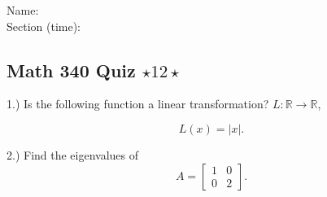 \documentclass{article}
\begin{document}
Name:\\
\medskip
Section (time):

\subsection*{Math 340 Quiz $\star 12 \star$}


1.) Is the following function a linear transformation? $L:\mathbb{R}\rightarrow \mathbb{R}$, 

$$L(x) = \vert x \vert .$$



2.) Find the eigenvalues of $$A=\left[ \begin{array}{cc}

1 & 0 \\
0 & 2 
\end{array} \right].$$


\pagebreak
\end{document}
